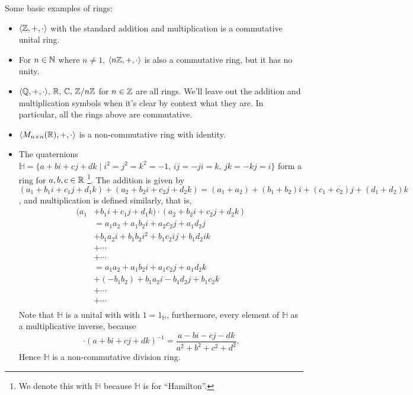\begin{example}
    Some basic examples of rings:
    \begin{itemize}
        \item $\langle \mathbb{Z},+,\cdot  \rangle $ with the standard addition and multiplication is a commutative unital ring. 
        \item For $n\in \mathbb{N}$ where $n\neq 1$, $\langle n\mathbb{Z},+,\cdot  \rangle $ is also a commutative ring, but it has no unity.
        \item $\langle \mathbb{Q},+,\cdot  \rangle ,\,\mathbb{R},\,\mathbb{C},\,\mathbb{Z} /n\mathbb{Z}$ for $n\in \mathbb{Z}$ are all rings. We'll leave out the addition and multiplication symbols when it's clear by context what they are. In particular, all the rings above are commutative.
        \item $\langle M_{n\times n}(\mathbb{R}),+,\cdot  \rangle $ is a non-commutative ring with identity.
        \item The quaternions $\mathbb{H}=\{a+bi+cj+dk \mid i^2=j^2=k^2=-1,\,ij=-ji=k,\,jk=-kj=i\} $ form a ring for $a,b,c\in \mathbb{R}$ \footnote{We denote this with $\mathbb{H}$ because $\mathbb{H}$ is for ``Hamilton''.}. The addition is given by $(a_1+b_1i+c_1j+d_1k)+(a_2+b_2i+c_2j+d_2k)=(a_1+a_2)+(b_1+b_2)i+(c_1+c_2)j+(d_1+d_2)k$, and multiplication is defined similarly, that is, 
            \begin{align*}
                (a_1&+b_1i+c_1j+d_1k)\cdot (a_2+b_2i+c_2j+d_2k)\\
                    &=a_1a_2+a_1b_2i+a_2c_2j+a_1d_2j\\
                     &+b_1a_2i+b_1b_2i^2+b_1c_2ij+b_1d_2ik\\
                     &+\cdots \\
                     &+\cdots \\
                     &=a_1a_2+a_1b_2i+a_1c_2j+a_1d_2k\\
                     &+(-b_1b_2)+b_1a_2i-b_1d_2j+b_1c_2k\\
                     &+\cdots\\
                     &+\cdots\\
            \end{align*}
            Note that $\mathbb{H}$ is a unital with with $1=1_{\mathbb{H}}$, furthermore, every element of $\mathbb{H}$ as a multiplicative inverse, because \[
                \cdot (a+bi+cj+dk)^{-1}=\frac{a-bi-cj-dk}{a^2+b^2+c^2+d^2}.
            \] Hence $\mathbb{H}$ is a non-commutative division ring. 
    \end{itemize}
\end{example}
